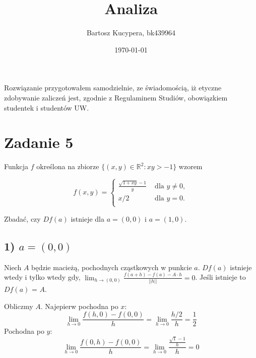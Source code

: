 \documentclass{article}
\title{Analiza}
\author{Bartosz Kucypera, bk439964}
\date{\today}
\begin{document}
\maketitle

Rozwiązanie przygotowałem samodzielnie, ze świadomością, iż etyczne zdobywanie zaliczeń jest, zgodnie z Regulaminem Studiów, obowiązkiem studentek i studentów UW.

\section*{Zadanie 5}

Funkcja $f$ określona na zbiorze $\{(x,y)\in \mathbb{R}^2:xy>-1\}$ wzorem

\[ 
f(x,y)=
\begin{cases} \displaystyle
	\frac{\sqrt{1+xy}-1}{y} & \mbox{ dla } y\neq0, \\
	x /2 & \mbox{ dla }y=0. \\
   \end{cases}
\]


Zbadać, czy $Df(a)$ istnieje dla $a=(0,0)$ i $a=(1,0)$.

\subsection*{1) $a=(0,0)$}
Niech $A$ będzie macieżą, pochodnych cząstkowych w punkcie $a$. \newline \newline 
$Df(a)$ istnieje wtedy i tylko wtedy gdy,  $\displaystyle \lim_{h \to (0,0)} \frac{f(a+h)-f(a)-A \cdot h}{||h||} = 0$. Jeśli istnieje to $Df(a)$ = $A$. \newline

Obliczmy $A$. Najepierw pochodna po $x$:
$$ \lim_{h \to 0} \frac{f(h,0) - f(0, 0)}{h} = 
\lim_{h \to 0} \frac{h/2}{h} = \frac{1}{2}$$
Pochodna po $y$:
$$
\lim_{h \to 0} \frac{f(0, h) - f(0, 0)}{h} = 
\lim_{h \to 0} \frac{\frac{\sqrt{1}-1}{h}}{h} = 0
$$
\end{document}
